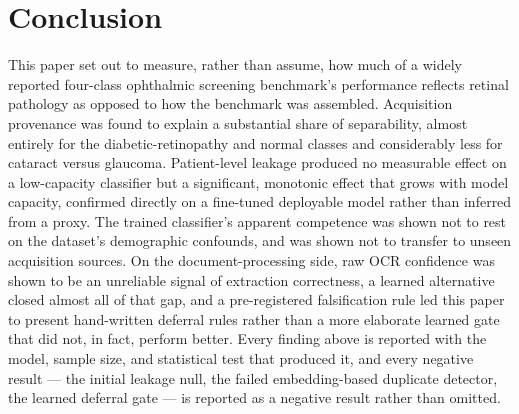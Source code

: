 \documentclass[conference]{IEEEtran}
\begin{document}
\section{Conclusion}

This paper set out to measure, rather than assume, how much of a widely
reported four-class ophthalmic screening benchmark's performance reflects
retinal pathology as opposed to how the benchmark was assembled.
Acquisition provenance was found to explain a substantial share of
separability, almost entirely for the diabetic-retinopathy and normal
classes and considerably less for cataract versus glaucoma. Patient-level
leakage produced no measurable effect on a low-capacity classifier but a
significant, monotonic effect that grows with model capacity, confirmed
directly on a fine-tuned deployable model rather than inferred from a
proxy. The trained classifier's apparent competence was shown not to rest
on the dataset's demographic confounds, and was shown not to transfer to
unseen acquisition sources. On the document-processing side, raw OCR
confidence was shown to be an unreliable signal of extraction correctness,
a learned alternative closed almost all of that gap, and a pre-registered
falsification rule led this paper to present hand-written deferral rules
rather than a more elaborate learned gate that did not, in fact, perform
better. Every finding above is reported with the model, sample size, and
statistical test that produced it, and every negative result --- the
initial leakage null, the failed embedding-based duplicate detector, the
learned deferral gate --- is reported as a negative result rather than
omitted.
\end{document}
